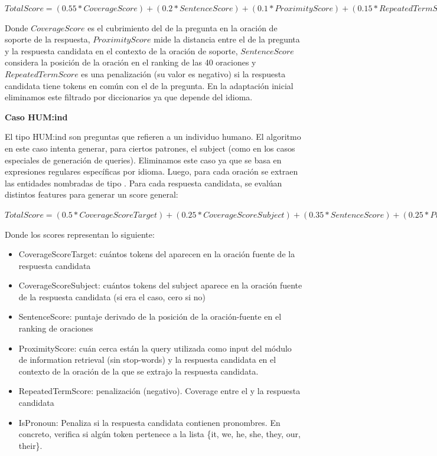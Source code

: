 $TotalScore = (0.55 * CoverageScore) + (0.2 * SentenceScore)	+ (0.1 * ProximityScore) + (0.15 * RepeatedTermScore)$

Donde $CoverageScore$ es el cubrimiento del  de la pregunta en la oración de soporte de la respuesta, $ProximityScore$ mide la distancia entre el  de la pregunta y la respuesta candidata en el contexto de la oración de soporte, $SentenceScore$ considera la posición de la oración en el ranking de las 40 oraciones y $RepeatedTermScore$ es una penalización (su valor es negativo) si la respuesta candidata tiene tokens en común con el  de la pregunta. En la adaptación inicial eliminamos este filtrado por diccionarios ya que depende del idioma. \newline

\textbf{Caso HUM:ind} \newline

El tipo HUM:ind son preguntas que refieren a un individuo humano. El algoritmo en este caso intenta generar, para ciertos patrones, el subject (como en los casos especiales de generación de queries). Eliminamos este caso ya que se basa en expresiones regulares específicas por idioma. Luego, para cada oración se extraen las entidades nombradas de tipo . Para cada respuesta candidata, se evalúan distintos features para generar un score general:

$TotalScore = (0.5 * CoverageScoreTarget)+ (0.25 * CoverageScoreSubject) + (0.35 * SentenceScore) +
					 (0.25 * ProximityScore)	+ (0.1 * RepeatedTermScore) + (0.5 * IsPronoun)$\newline

Donde los scores representan lo siguiente:
\begin{itemize}
  \item CoverageScoreTarget: cuántos tokens del  aparecen en la oración fuente de la respuesta candidata
  \item CoverageScoreSubject: cuántos tokens del subject aparece en la oración fuente de la respuesta candidata (si era el caso, cero si no)
  \item SentenceScore: puntaje derivado de la posición de la oración-fuente en el ranking de oraciones
  \item ProximityScore: cuán cerca están la query utilizada como input del módulo de information retrieval (sin stop-words) y la respuesta candidata en el contexto de la oración de la que se extrajo la respuesta candidata.
  \item RepeatedTermScore: penalización (negativo). Coverage entre el  y la respuesta candidata
  \item IsPronoun: Penaliza si la respuesta candidata contienen pronombres. En concreto, verifica si algún token pertenece a la lista \{it, we, he, she, they, our, their\}.
\end{itemize}


